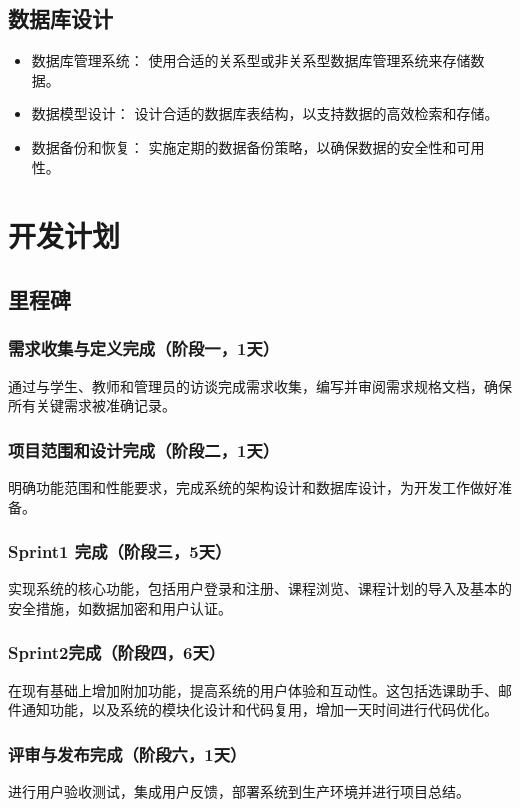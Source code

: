 \documentclass{article}
\begin{document}
\subsection{数据库设计}
\begin{itemize}
    \item 数据库管理系统： 使用合适的关系型或非关系型数据库管理系统来存储数据。
    \item 数据模型设计： 设计合适的数据库表结构，以支持数据的高效检索和存储。
    \item 数据备份和恢复： 实施定期的数据备份策略，以确保数据的安全性和可用性。
\end{itemize}

\section{开发计划}
\subsection{里程碑}
\subsubsection{需求收集与定义完成（阶段一，1天）}
通过与学生、教师和管理员的访谈完成需求收集，编写并审阅需求规格⽂档，确保所有关键需求被准确记录。

\subsubsection{项目范围和设计完成（阶段二，1天）}
明确功能范围和性能要求，完成系统的架构设计和数据库设计，为开发⼯作做好准备。

\subsubsection{Sprint1 完成（阶段三，5天）}
实现系统的核心功能，包括用户登录和注册、课程浏览、课程计划的导⼊及基本的安全措施，如数据加密和用户认证。

\subsubsection{Sprint2完成（阶段四，6天）}
在现有基础上增加附加功能，提高系统的用户体验和互动性。这包括选课助⼿、邮件通知功能，以及系统的模块化设计和代码复用，增加一天时间进⾏代码优化。

\subsubsection{评审与发布完成（阶段六，1天）}
进行用户验收测试，集成用户反馈，部署系统到⽣产环境并进行项目总结。
\end{document}
